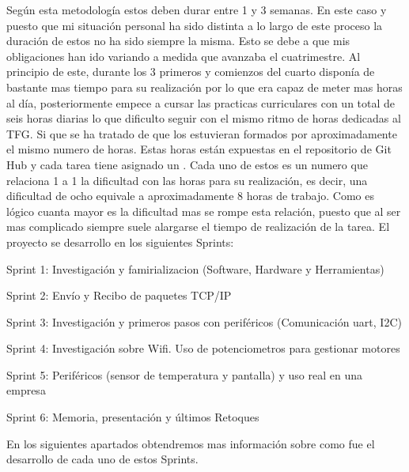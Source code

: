 Según esta metodología estos  deben durar entre 1 y 3 semanas. En este caso y puesto que mi situación personal ha sido distinta a lo largo de este proceso la duración de estos  no ha sido siempre la misma. Esto se debe a que mis obligaciones han ido variando a medida que avanzaba el cuatrimestre. Al principio de este, durante los 3 primeros  y comienzos del cuarto disponía de bastante mas tiempo para su realización por lo que era capaz de meter mas horas al día, posteriormente empece a cursar las practicas curriculares con un total de seis horas diarias lo que dificulto seguir con el mismo ritmo de horas dedicadas al TFG. Si que se ha tratado de que los  estuvieran formados por aproximadamente el mismo numero de horas. Estas horas están expuestas en el repositorio de Git Hub y cada tarea tiene asignado un . Cada uno de estos  es un numero que relaciona 1 a 1 la dificultad con las horas para su realización, es decir, una dificultad de ocho equivale a aproximadamente 8 horas de trabajo. Como es lógico cuanta mayor es la dificultad mas se rompe esta relación, puesto que al ser mas complicado siempre suele alargarse el tiempo de realización de la tarea. 
El proyecto se desarrollo en los siguientes Sprints:
\begin{description}
\item Sprint 1: Investigación y famirializacion (Software, Hardware y Herramientas)
\item Sprint 2: Envío y Recibo de paquetes TCP/IP
\item Sprint 3: Investigación y primeros pasos con periféricos (Comunicación uart, I2C)
\item Sprint 4: Investigación sobre Wifi. Uso de potenciometros para gestionar motores
\item Sprint 5: Periféricos (sensor de temperatura y pantalla) y uso real en una empresa
\item Sprint 6: Memoria, presentación y últimos Retoques
\end{description}
En los siguientes apartados obtendremos mas información sobre como fue el desarrollo de cada uno de estos Sprints.


